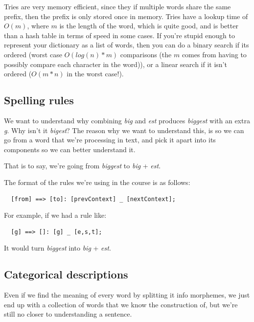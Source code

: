Tries are very memory efficient, since they if multiple words share the same
prefix, then the prefix is only stored once in memory. Tries have a lookup time
of $O(m)$, where $m$ is the length of the word, which is quite good, and is
better than a hash table in terms of speed in some cases. If you're stupid
enough to represent your dictionary as a list of words, then you can do a binary
search if its ordered (worst case $O(log(n) * m)$ comparisons (the $m$ comes
from having to possibly compare each character in the word)), or a linear search
if it isn't ordered ($O(m*n)$ in the worst case!).

\subsection{Spelling rules}

We want to understand why combining \textit{big} and \textit{est} produces
\textit{biggest} with an extra \textit{g}. Why isn't it \textit{bigest}? The
reason why we want to understand this, is so we can go from a word that we're
processing in text, and pick it apart into its components so we can better
understand it.

That is to say, we're going from \textit{biggest} to \textit{big} +
\textit{est}.

The format of the rules we're using in the course is as follows:


\begin{verbatim}
  [from] ==> [to]: [prevContext] _ [nextContext];
\end{verbatim}

For example, if we had a rule like:

\begin{verbatim}
  [g] ==> []: [g] _ [e,s,t];
\end{verbatim}

It would turn \textit{biggest} into \textit{big} + \textit{est}.

\subsection{Categorical descriptions}

Even if we find the meaning of every word by splitting it info morphemes, we
just end up with a collection of words that we know the construction of, but
we're still no closer to understanding a sentence.

